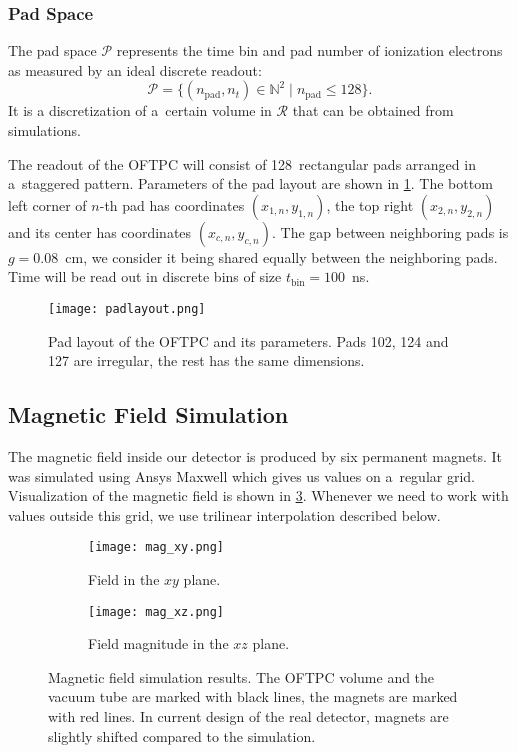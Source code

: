 			\subsubsection{Pad Space}
				The pad space $\mathcal{P}$ represents the time bin and pad number of ionization electrons as measured by an ideal discrete readout:
					\begin{equation}
						\mathcal{P} = \{(n_\text{pad},n_t)\in\mathbb{N}^2 \mid n_\text{pad}\leq128\}.
					\end{equation}
				It is a discretization of a~certain volume in $\mathcal{R}$ that can be obtained from simulations.
				
				The readout of the \ac{OFTPC} will consist of 128~rectangular pads arranged in a~staggered pattern. Parameters of the pad layout are shown in \cref{fig:padlayout}. The bottom left corner of $n$\nobreakdash-th pad has coordinates $(x_{1,n},y_{1,n})$, the  top right $(x_{2,n},y_{2,n})$ and its center has coordinates $(x_{c,n},y_{c,n})$. The gap between neighboring pads is $g=0.08$~cm, we consider it being shared equally between the neighboring pads. Time will be read out in discrete bins of size $t_\text{bin}=100$~ns.
			
				\begin{figure}[H]
					\centering
					\texttt{[image: padlayout.png]}
					\caption{Pad layout of the \ac{OFTPC} and its parameters. Pads 102, 124 and 127 are irregular, the rest has the same dimensions.}
					\label{fig:padlayout}
				\end{figure}
		
		\subsection{Magnetic Field Simulation}
		\label{sec:mag}
			The magnetic field inside our detector is produced by six permanent magnets. It was simulated using Ansys Maxwell which gives us values on a~regular grid. Visualization of the magnetic field is shown in \cref{fig:mag}. Whenever we need to work with values outside this grid, we use trilinear interpolation described below.
			
			\begin{figure}
				\centering
				\begin{subfigure}[t]{0.45\textwidth}
					\centering
					\texttt{[image: mag\_xy.png]}
					\caption{Field in the $xy$ plane.}
				\end{subfigure}
				\hfill
				\begin{subfigure}[t]{0.45\textwidth}
					\centering
					\texttt{[image: mag\_xz.png]}
					\caption{Field magnitude in the $xz$ plane.}
					\label{fig:mag_xz}
				\end{subfigure}
				\caption{Magnetic field simulation results. The \ac{OFTPC} volume and the vacuum tube are marked with black lines, the magnets are marked with red lines. In current design of the real detector, magnets are slightly shifted compared to the simulation.}
				\label{fig:mag}
			\end{figure}
		
